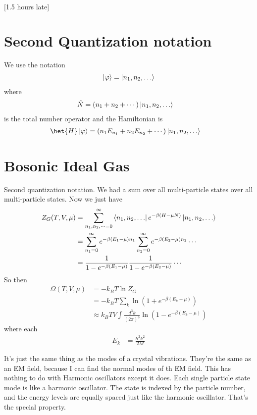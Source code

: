 [1.5 hours late]
\section{Second Quantization notation}
We use the notation
\begin{align}
    \ket{\varphi} = \ket{n_1, n_2, \ldots}
\end{align}
where
\begin{align}
    \hat{N} &=
    \left( n_1 + n_2 + \cdots \right)
    \ket{n_1, n_2, \ldots}
\end{align}
is the total number operator and the Hamiltonian is
\begin{align}
    \het{H} \ket{\varphi} &=
    \left( 
    n_1 E_{n_1} + n_2 E_{n_2} + \cdots
    \right)
    \ket{n_1, n_2, \ldots}
\end{align}

\section{Bosonic Ideal Gas}
Second quantization notation.
We had a sum over all multi-particle states over all multi-particle states.
Now we just have
\begin{align}
    Z_G(T, V, \mu) &=
    \sum_{n_1, n_2, \cdots = 0}^{\infty}
    \bra{n_1,n_2,\ldots} e^{-\beta(H - \mu N)} \ket{n_1,n_2,\ldots}\\
    &=
    \sum_{n_1=0}^{\infty} e^{-\beta(E_1 - \mu) n_1}
    \sum_{n_2=0}^{\infty} e^{-\beta(E_2 - \mu) n_2}
    \cdots\\
    &=
    \frac{1}{1 - e^{-\beta(E_1 - \mu)}}
    \frac{1}{1 - e^{-\beta(E_2 - \mu)}}
    \cdots
\end{align}
So then
\begin{align}
    \Omega(T, V, \mu) &=
    -k_B T \ln Z_G\\
    &=
    -k_BT \sum_k \ln\left( 1 + e^{-\beta (E_k - \mu)} \right)\\
    &\approx
    k_B TV \int \frac{d^3k}{(2\pi)^3}
    \ln\left( 1 - e^{-\beta(E_k - \mu)} \right)
\end{align}
where each
\begin{align}
    E_k &= \frac{\hbar^2 k^2}{2M}
\end{align}

It's just the same thing as the modes of a crystal vibrations.
They're the same as an EM field,
because I can find the normal modes of th EM field.
This has nothing to do with Harmonic oscillators except it does.
Each single particle state mode is like a harmonic oscillator.
The state is indexed by the particle number,
and the energy levels are equally spaced just like the harmonic oscillator.
That's the special property.

